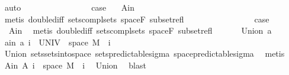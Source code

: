 \begin{isabellebody}
\ auto\isanewline
\ \ \isacommand{{\isacharbraceleft}{\kern0pt}}\isamarkupfalse%
\isanewline
\ \ \ \ \isamarkupfalse%
\ {}\isanewline
\ \ \ \ \isamarkupfalse%
\ \isamarkupfalse%
\ {\isacharquery}{\kern0pt}case\ \isamarkupfalse%
\ {\isacharasterisk}{\kern0pt}\ A{\isacharunderscore}{\kern0pt}in\ \isamarkupfalse%
\ {\isacharparenleft}{\kern0pt}metis\ double{\isacharunderscore}{\kern0pt}diff\ sets{\isachardot}{\kern0pt}compl{\isacharunderscore}{\kern0pt}sets\ space{\isacharunderscore}{\kern0pt}F\ subset{\isacharunderscore}{\kern0pt}refl{\isacharparenright}{\kern0pt}\isanewline
\ \ \isamarkupfalse%
\isanewline
\ \ \ \ \isamarkupfalse%
\ {}\isanewline
\ \ \ \ \isamarkupfalse%
\ \isamarkupfalse%
\ {\isacharquery}{\kern0pt}case\ \isamarkupfalse%
\ {\isacharasterisk}{\kern0pt}\ A{\isacharunderscore}{\kern0pt}in\ \isamarkupfalse%
\ {\isacharparenleft}{\kern0pt}metis\ double{\isacharunderscore}{\kern0pt}diff\ sets{\isachardot}{\kern0pt}compl{\isacharunderscore}{\kern0pt}sets\ space{\isacharunderscore}{\kern0pt}F\ subset{\isacharunderscore}{\kern0pt}refl{\isacharparenright}{\kern0pt}\isanewline
\ \ \isacommand{{\isacharbraceright}{\kern0pt}}\isamarkupfalse%
\isanewline
{}\isamarkupfalse%
\isanewline
\ \ \isamarkupfalse%
\ {\isacharparenleft}{\kern0pt}Union\ a{\isacharparenright}{\kern0pt}\isanewline
\ \ \isamarkupfalse%
\ a{\isacharunderscore}{\kern0pt}in{\isacharcolon}{\kern0pt}\ {\isachardoublequoteopen}a\ i\ {\isasymsubseteq}\ UNIV\ {\isasymtimes}\ space\ M{\isachardoublequoteclose}\ \ i\ \isamarkupfalse%
\ Union{\isacharparenleft}{\kern0pt}{}{\isacharparenright}{\kern0pt}\ sets{\isachardot}{\kern0pt}sets{\isacharunderscore}{\kern0pt}into{\isacharunderscore}{\kern0pt}space\ sets{\isacharunderscore}{\kern0pt}predictable{\isacharunderscore}{\kern0pt}sigma\ space{\isacharunderscore}{\kern0pt}predictable{\isacharunderscore}{\kern0pt}sigma\ \isamarkupfalse%
\ metis\isanewline
\ \ \isamarkupfalse%
\ A{\isacharunderscore}{\kern0pt}in{\isacharcolon}{\kern0pt}\ {\isachardoublequoteopen}A\ i\ {\isasymsubseteq}\ space\ M{\isachardoublequoteclose}\ \ i\ \isamarkupfalse%
\ Union{\isacharparenleft}{\kern0pt}{}{\isacharparenright}{\kern0pt}\ \isamarkupfalse%
\ blast\isanewline
\ \ \isamarkupfalse%

\end{isabellebody}

